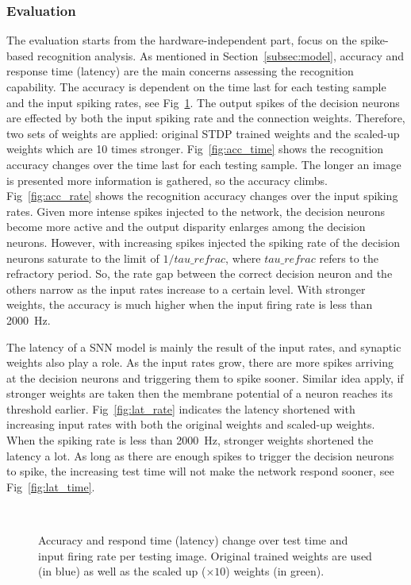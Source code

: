 \subsubsection{Evaluation}
The evaluation starts from the hardware-independent part, focus on the spike-based recognition analysis.
As mentioned in Section~\ref{subsec:model}, accuracy and response time (latency) are the main concerns assessing the recognition capability.
The accuracy is dependent on the time last for each testing sample and the input spiking rates, see Fig~\ref{fig:assess}.
The output spikes of the decision neurons are effected by both the input spiking rate and the connection weights.
Therefore, two sets of weights are applied: original STDP trained weights and the scaled-up weights which are 10 times stronger.
Fig~\ref{fig:acc_time} shows the recognition accuracy changes over the time last for each testing sample.
The longer an image is presented more information is gathered, so the accuracy climbs.
Fig~\ref{fig:acc_rate} shows the recognition accuracy changes over the input spiking rates.
Given more intense spikes injected to the network, the decision neurons become more active and the output disparity enlarges among the decision neurons.
However, with increasing spikes injected the spiking rate of the decision neurons saturate to the limit of $1/tau\_refrac$, where $tau\_refrac$ refers to the refractory period.  
So, the rate gap between the correct decision neuron and the others narrow as the input rates increase to a certain level.
With stronger weights, the accuracy is much higher when the input firing rate is less than 2000~Hz.


The latency of a SNN model is mainly the result of the input rates, and synaptic weights also play a role.
As the input rates grow, there are more spikes arriving at the decision neurons and triggering them to spike sooner.
Similar idea apply, if stronger weights are taken then the membrane potential of a neuron reaches its threshold earlier.
Fig~\ref{fig:lat_rate} indicates the latency shortened with increasing input rates with both the original weights and scaled-up weights.
When the spiking rate is less than 2000~Hz, stronger weights shortened the latency a lot.
As long as there are enough spikes to trigger the decision neurons to spike, the increasing test time will not make the network respond sooner, see Fig~\ref{fig:lat_time}.
	\begin{figure}[htb!]
	  \centering
	  	  \\
	  \caption{Accuracy and respond time (latency) change over test time and input firing rate per testing image. Original trained weights are used (in blue) as well as the scaled up ($\times10$) weights (in green). }
	  \label{fig:assess}
	\end{figure}

